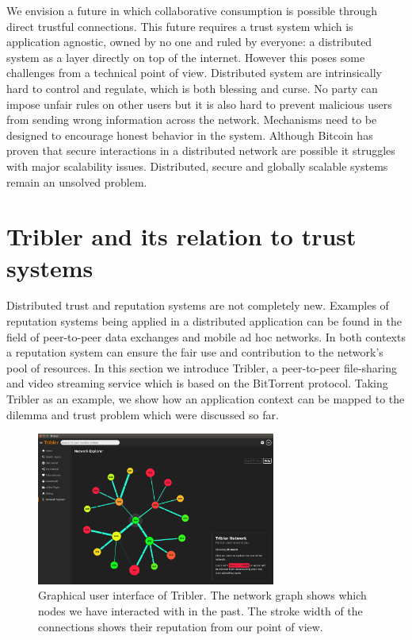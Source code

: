 We envision a future in which collaborative consumption is possible through direct trustful connections. This
future requires a trust system which is application agnostic, owned by no one and ruled by 
everyone: a distributed system as a layer directly on top of the internet. However this poses some 
challenges from a technical point of view. Distributed system are intrinsically hard to control and regulate, which is both 
blessing and curse. No party can impose unfair rules on other users but it is also hard to prevent 
malicious users from sending wrong information across the network. Mechanisms need to be designed to
encourage honest behavior in the system. Although Bitcoin has proven that secure interactions in a
distributed network are possible it struggles with major scalability issues.\cite{gervais2016security}
Distributed, secure and globally scalable systems remain an unsolved problem. 

\section{Tribler and its relation to trust systems}
\label{sec:tribler}
Distributed trust and reputation systems are not completely new. Examples of reputation systems
being applied in a distributed application can be found in the field of peer-to-peer
data exchanges and mobile ad hoc networks. \cite{HENDRIKX2015184} In both contexts a reputation system
can ensure the fair use and contribution to the network's pool of resources. In this section we 
introduce Tribler, a peer-to-peer file-sharing and video streaming service which is based on the 
BitTorrent protocol. Taking Tribler as an example, we show how an application context can be mapped to 
the dilemma and trust problem which were discussed so far.

\begin{figure}
    \centering
    \includegraphics[width=0.7\textwidth]{images/tribler}
    \caption{Graphical user interface of Tribler. The network graph shows which nodes we have 
    interacted with in the past. The stroke width of the connections shows their reputation from 
    our point of view.}
    \label{fig:tribler}
\end{figure}

